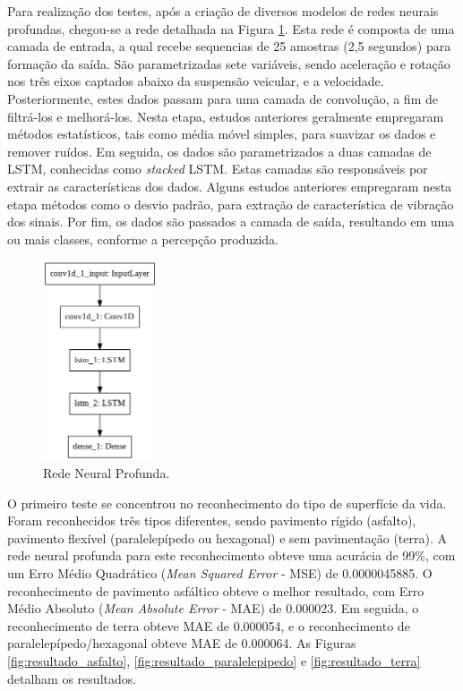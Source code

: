Para realização dos testes, após a criação de diversos modelos de redes neurais profundas, chegou-se a rede detalhada na Figura \ref{fig:rede_proposta}. Esta rede é composta de uma camada de entrada, a qual recebe sequencias de 25 amostras (2,5 segundos) para formação da saída. São parametrizadas sete variáveis, sendo aceleração e rotação nos três eixos captados abaixo da suspensão veicular, e a velocidade. Posteriormente, estes dados passam para uma camada de convolução, a fim de filtrá-los e melhorá-los. Nesta etapa, estudos anteriores geralmente empregaram métodos estatísticos, tais como média móvel simples, para suavizar os dados e remover ruídos. Em seguida, os dados são parametrizados a duas camadas de LSTM, conhecidas como \textit{stacked} LSTM. Estas camadas são responsáveis por extrair as características dos dados. Alguns estudos anteriores empregaram nesta etapa métodos como o desvio padrão, para extração de característica de vibração dos sinais. Por fim, os dados são passados a camada de saída, resultando em uma ou mais classes, conforme a percepção produzida.

\begin{figure}[h!]
  \centering
  \caption{Rede Neural Profunda.}
   \label{fig:rede_proposta}
   \includegraphics[width=0.3\textwidth]{figuras/fig4_2.png}
\end{figure}

O primeiro teste se concentrou no reconhecimento do tipo de superfície da vida. Foram reconhecidos três tipos diferentes, sendo pavimento rígido (asfalto), pavimento flexível (paralelepípedo ou hexagonal) e sem pavimentação (terra). A rede neural profunda para este reconhecimento obteve uma acurácia de 99\%, com um Erro Médio Quadrático (\textit{Mean Squared Error} - MSE) de 0.0000045885. O reconhecimento de pavimento asfáltico obteve o melhor resultado, com Erro Médio Absoluto (\textit{Mean Absolute Error} - MAE) de 0.000023. Em seguida, o reconhecimento de terra obteve MAE de 0.000054, e o reconhecimento de paralelepípedo/hexagonal obteve MAE de 0.000064. As Figuras \ref{fig:resultado_asfalto}, \ref{fig:resultado_paralelepipedo} e \ref{fig:resultado_terra} detalham os resultados.

